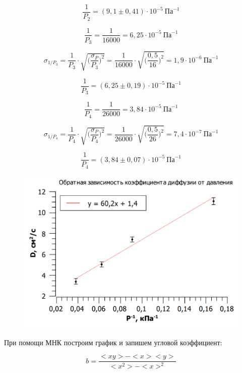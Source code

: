 \documentclass[11pt]{article}
\begin{document}
\[\frac{1}{P_2} = (9,1 \pm 0,41) \cdot  10^{-5} \: \textit{Па}^{-1}\]

\vspace{0.3cm}

\[\frac{1}{P_3} = \frac{1}{16000} = 6,25 \cdot 10^{-5} \: \textit{Па}^{-1}\]

\[\sigma_{1/P_3} = \frac{1}{P_3} \cdot \sqrt{\Big( \frac{\sigma_P}{P_3} \Big)^2} = \frac{1}{16000} \cdot \sqrt{\Big( \frac{0,5}{16} \Big)^2} = 1,9 \cdot 10^{-6} \: \textit{Па}^{-1}\]

\[\frac{1}{P_3} = (6,25 \pm 0,19)\cdot  10^{-5} \:\textit{Па}^{-1}\]

\vspace{0.3cm}

\[\frac{1}{P_4} = \frac{1}{26000} = 3,84 \cdot 10^{-5} \: \textit{Па}^{-1}\]

\[\sigma_{1/P_4} = \frac{1}{P_4} \cdot \sqrt{\Big( \frac{\sigma_P}{P_4} \Big)^2} = \frac{1}{26000} \cdot \sqrt{\Big( \frac{0,5}{26} \Big)^2} = 7,4 \cdot 10^{-7} \: \textit{Па}^{-1}\]

\[\frac{1}{P_4} = (3,84 \pm 0,07) \cdot  10^{-5} \: \textit{Па}^{-1}\]

\begin{figure}[h!]
\centering
\includegraphics[scale=0.6]{D.png}
\label{fig:Image1}
\end{figure}

При помощи МНК построим график и запишем угловой коэффициент:

\vspace{0.3cm}

\[b = \frac{<xy> - <x><y>}{<x^2> - <x>^2}\]
\end{document}
